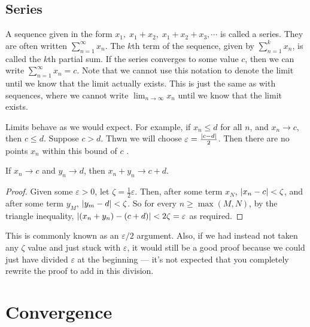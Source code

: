 \documentclass{article}
\begin{document}
	\subsection{Series}
	A sequence given in the form $x_1,\; x_1 + x_2,\; x_1 + x_2 + x_3, \cdots$ is called a series. They are often written $\sum_{n=1}^\infty x_n$. The $k$th term of the sequence, given by $\sum_{n=1}^k x_n$, is called the $k$th partial sum. If the series converges to some value $c$, then we can write $\sum_{n=1}^\infty x_n = c$. Note that we cannot use this notation to denote the limit until we know that the limit actually exists. This is just the same as with sequences, where we cannot write $\lim_{n\to\infty} x_n$ until we know that the limit exists.

	Limits behave as we would expect. For example, if $x_n \leq d$ for all $n$, and $x_n \to c$, then $c \leq d$. Suppose $c > d$. Thwn we will choose $\varepsilon = \frac{\abs{c - d}}{2}$. Then there are no points $x_n$ within this bound of $c$ \contradiction.

	\begin{proposition}
		If $x_n \to c$ and $y_n \to d$, then $x_n + y_n \to c + d$.
	\end{proposition}
	\begin{proof}
		Given some $\varepsilon > 0$, let $\zeta = \frac{1}{2}\varepsilon$. Then, after some term $x_N$, $\abs{x_n - c} < \zeta$, and after some term $y_M$, $\abs{y_m - d} < \zeta$. So for every $n \geq \max(M, N)$, by the triangle inequality, $\abs{(x_n + y_n) - (c + d)} < 2\zeta = \varepsilon$ as required.
	\end{proof}
	This is commonly known as an $\varepsilon/2$ argument. Also, if we had instead not taken any $\zeta$ value and just stuck with $\varepsilon$, it would still be a good proof because we could just have divided $\varepsilon$ at the beginning --- it's not expected that you completely rewrite the proof to add in this division.

	\section{Convergence}
\end{document}

